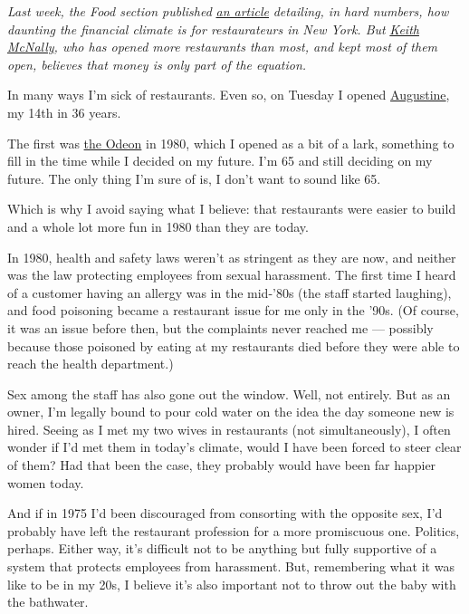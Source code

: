 \emph{Last week, the Food section published}
\href{http://www.nytimes3xbfgragh.onion/2016/10/26/dining/restaurant-economics-new-york.html}{\emph{an
article}} \emph{detailing, in hard numbers, how daunting the financial
climate is for restaurateurs in New York. But}
\href{http://www.nytimes3xbfgragh.onion/2004/01/18/style/the-restaurateur-who-invented-downtown.html?pagewanted=print}{\emph{Keith
McNally}}\emph{, who has opened more restaurants than most, and kept
most of them open, believes that money is only part of the equation.}

In many ways I'm sick of restaurants. Even so, on Tuesday I opened
\href{http://www.thompsonhotels.com/hotels/the-beekman/eat-drink}{Augustine},
my 14th in 36 years.

The first was
\href{http://www.nytimes3xbfgragh.onion/2016/03/24/fashion/brighter-lights-bigger-city-odeons-second-act.html}{the
Odeon} in 1980, which I opened as a bit of a lark, something to fill in
the time while I decided on my future. I'm 65 and still deciding on my
future. The only thing I'm sure of is, I don't want to sound like 65.

Which is why I avoid saying what I believe: that restaurants were easier
to build and a whole lot more fun in 1980 than they are today.

In 1980, health and safety laws weren't as stringent as they are now,
and neither was the law protecting employees from sexual harassment. The
first time I heard of a customer having an allergy was in the mid-'80s
(the staff started laughing), and food poisoning became a restaurant
issue for me only in the '90s. (Of course, it was an issue before then,
but the complaints never reached me --- possibly because those poisoned
by eating at my restaurants died before they were able to reach the
health department.)

Sex among the staff has also gone out the window. Well, not entirely.
But as an owner, I'm legally bound to pour cold water on the idea the
day someone new is hired. Seeing as I met my two wives in restaurants
(not simultaneously), I often wonder if I'd met them in today's climate,
would I have been forced to steer clear of them? Had that been the case,
they probably would have been far happier women today.

And if in 1975 I'd been discouraged from consorting with the opposite
sex, I'd probably have left the restaurant profession for a more
promiscuous one. Politics, perhaps. Either way, it's difficult not to be
anything but fully supportive of a system that protects employees from
harassment. But, remembering what it was like to be in my 20s, I believe
it's also important not to throw out the baby with the bathwater.

